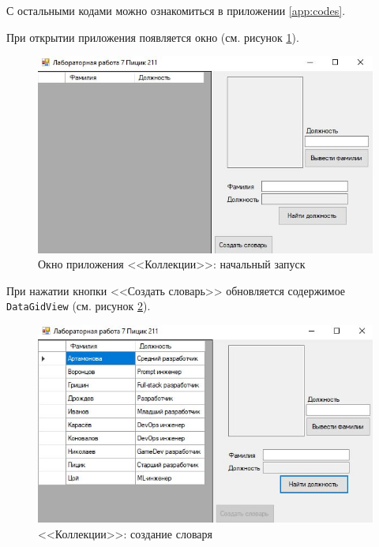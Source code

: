 С остальными кодами можно ознакомиться в приложении \ref{app:codes}.

При открытии приложения появляется окно (см. рисунок \ref{fig:cols_res}).
\begin{figure}[H]
  \centering
  \includegraphics[scale=.85]{../img/collections/collections_res.jpg}
  \caption{Окно приложения <<Коллекции>>: начальный запуск}
  \label{fig:cols_res}
\end{figure}

При нажатии кнопки <<Создать словарь>> обновляется содержимое \verb|DataGidView|
(см. рисунок \ref{fig:cols_create}).
\begin{figure}[H]
  \centering
  \includegraphics[scale=.85]{../img/collections/collections_create.jpg}
  \caption{<<Коллекции>>: создание словаря}
  \label{fig:cols_create}
\end{figure}

